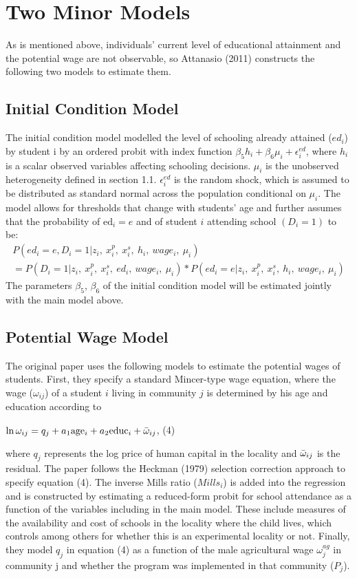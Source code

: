 \documentclass{handoutForSolutions}
\begin{document}
\newpage
\section{Two Minor Models}
As is mentioned above, individuals' current level of educational attainment and the potential wage are not observable, so Attanasio (2011) constructs the following two models to estimate them.
\subsection{Initial Condition Model}
The initial condition model modelled the level of schooling already attained ($ed_i$) by student i by an ordered probit with index function $\beta_5 h_i+\beta_6 \mu_i+\epsilon^{ed}_i$, where $h_i$ is a scalar observed variables affecting schooling decisions. $\mu_i$ is the unobserved heterogeneity defined in section 1.1. $\epsilon^{ed}_i$ is the random shock, which is assumed to be distributed as standard normal across the population conditional on $\mu_i$. The model allows for thresholds that change with students' age and further assumes that the probability of $\mathrm{e}\mathrm{d}_{i}=e$ and of student $i$ attending school $(D_i=1)$ to be:
\begin{gather*}
        P(ed_i=e, D_i=1|z_i,\ x_i^p,\ x_i^s,\ h_i,\  wage_i,\ \mu_i)\\= P(D_i=1|z_i,\ x_i^p,\ x_i^s,\ ed_i,\  wage_i,\ \mu_i)*P(ed_i=e|z_i,\ x_i^p,\ x_i^s,\ h_i,\  wage_i,\ \mu_i)
\end{gather*}
The parameters $\beta_5$, $\beta_6$ of the initial condition model will be estimated jointly with the main model above.
\subsection{Potential Wage Model}
The original paper uses the following models to estimate the potential wages of students. First, they specify a standard Mincer-type wage equation, where the wage ($\omega_{ij}$) of a student $i$ living in community $j$ is determined by his age and education according to
\begin{center}
$\ln\omega_{ij}=q_{j}+a_1\mathrm{a}\mathrm{g}\mathrm{e}_{i}+a_2\mathrm{e}\mathrm{d}\mathrm{u}\mathrm{c}_{i}+\Bar{\omega}_{ij}$,   (4)
\end{center}
where $q_{j}$ represents the log price of human capital in the locality and $\Bar{\omega}_{ij}$ is the residual. The paper follows the Heckman (1979) selection correction approach to specify equation (4). The inverse Mills ratio ($Mills_i$) is added into the regression and is constructed by estimating a reduced-form probit for school attendance as a function of the variables including in the main model. These include measures of the availability and cost of schools in the locality where the child lives, which controls among others for whether this is an experimental locality or not. Finally, they model $q_{j}$ in equation (4) as a function of the male agricultural wage $\omega^{ag}_j$ in community j and whether the program was implemented in that community ($P_j$).\\
\end{document}
